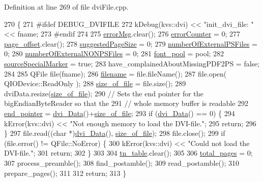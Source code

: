 Definition at line 269 of file dvi\+File.\+cpp.


\begin{DoxyCode}
270 \{
271 \textcolor{preprocessor}{#ifdef DEBUG\_DVIFILE}
272   kDebug(kvs::dvi) << \textcolor{stringliteral}{"init\_dvi\_file: "} << fname;
273 \textcolor{preprocessor}{#endif}
274 
275   \hyperlink{classdvifile_a57d83b062272da49940bb34863d0b595}{errorMsg}.clear();
276   \hyperlink{classdvifile_a9f1a21857ce4a3eeb9490ea63b1bfdcb}{errorCounter} = 0;
277   \hyperlink{classdvifile_aeafc97277647ad5077a774be71b3253a}{page\_offset}.clear();
278   \hyperlink{classdvifile_a9fdbeee20bb39fcafe317925767b24ef}{suggestedPageSize} = 0;
279   \hyperlink{classdvifile_abd8bd3fc29f66ce9220efbd0246d7fc0}{numberOfExternalPSFiles} = 0;
280   \hyperlink{classdvifile_a341ffd0f617655a308d5d86fbb085400}{numberOfExternalNONPSFiles} = 0;
281   \hyperlink{classdvifile_a4864f0edcaad892f4684ab2379f061b9}{font\_pool}    = pool;
282   \hyperlink{classdvifile_a3121bb4c368ca1d30949cffb1df44d81}{sourceSpecialMarker} = \textcolor{keyword}{true};
283   have\_complainedAboutMissingPDF2PS = \textcolor{keyword}{false};
284 
285   QFile file(fname);
286   \hyperlink{classdvifile_a1c0fe420231e71f256b5db367b7e1178}{filename} = file.fileName();
287   file.open( QIODevice::ReadOnly );
288   \hyperlink{classdvifile_ac136b96471bfd7873dbcb0425240dd0e}{size\_of\_file} = file.size();
289   dviData.resize(\hyperlink{classdvifile_ac136b96471bfd7873dbcb0425240dd0e}{size\_of\_file});
290   \textcolor{comment}{// Sets the end pointer for the bigEndianByteReader so that the}
291   \textcolor{comment}{// whole memory buffer is readable}
292   \hyperlink{classbigEndianByteReader_ace2790221530572c87c58f1f77924beb}{end\_pointer} = \hyperlink{classdvifile_a81f1d32c52377a7b1802072eb40998b7}{dvi\_Data}()+\hyperlink{classdvifile_ac136b96471bfd7873dbcb0425240dd0e}{size\_of\_file};
293   \textcolor{keywordflow}{if} (\hyperlink{classdvifile_a81f1d32c52377a7b1802072eb40998b7}{dvi\_Data}() == 0) \{
294     kError(kvs::dvi) << \textcolor{stringliteral}{"Not enough memory to load the DVI-file."};
295     \textcolor{keywordflow}{return};
296   \}
297   file.read((\textcolor{keywordtype}{char} *)\hyperlink{classdvifile_a81f1d32c52377a7b1802072eb40998b7}{dvi\_Data}(), \hyperlink{classdvifile_ac136b96471bfd7873dbcb0425240dd0e}{size\_of\_file});
298   file.close();
299   \textcolor{keywordflow}{if} (file.error() != QFile::NoError) \{
300     kError(kvs::dvi) << \textcolor{stringliteral}{"Could not load the DVI-file."};
301     \textcolor{keywordflow}{return};
302   \}
303 
304   \hyperlink{classdvifile_a05cb283609e6d1627940d14e8fc85b62}{tn\_table}.clear();
305 
306   \hyperlink{classdvifile_a71577dbd82a462b855abc96be3b369c5}{total\_pages} = 0;
307   process\_preamble();
308   find\_postamble();
309   read\_postamble();
310   prepare\_pages();
311 
312   \textcolor{keywordflow}{return};
313 \}
\end{DoxyCode}
